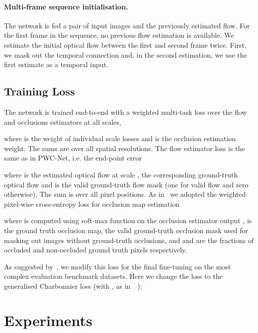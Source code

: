 \documentclass[runningheads]{llncs}
\begin{document}
\paragraph{\bf\textbf{Multi-frame sequence initialisation.}}
The network is fed a pair of input images and the previously estimated flow. 
For the first frame in the sequence, no previous flow estimation is available.
We estimate the initial optical flow between the first and second frame twice. First, we mask out the temporal connection and, in the second estimation, we use the first estimate as a temporal input.


\subsection{Training Loss}
The network is trained end-to-end with a weighted multi-task loss over the flow and occlusions estimators at all scales,

where  is the weight of individual scale  losses and  is the occlusion estimation weight. The sums are over all  spatial resolutions.
The flow estimator loss  is the same as in PWC-Net, i.e. the end-point error

where  is the estimated optical flow at scale ,  the corresponding ground-truth optical flow and  is the valid ground-truth flow mask (one for valid flow and zero otherwise). The sum is over all pixel positions.
As in~\cite{Xie2015,Caelles2017} we adopted the  weighted pixel-wise cross-entropy loss for occlusion map estimation

where  is computed using soft-max  function on the occlusion estimator output ,  is the ground truth occlusion map,  the valid ground-truth occlusion mask used for masking out images without ground-truth occlusions, and  and  are the fractions of occluded and non-occluded ground truth pixels respectively.

As suggested by~\cite{Sun2017}, we modify this loss for the final fine-tuning on the most complex evaluation benchmark datasets. Here we change the  loss to the generalised Charbonnier loss (with ,  as in~~\cite{Sun2017}):

 
\section{Experiments}
\label{sec:experiments}
\end{document}
